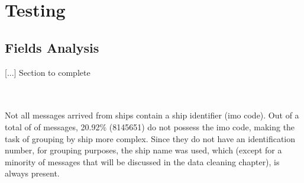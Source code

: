 \chapter{Testing}

\section{Fields Analysis}

[...] Section to complete

\\

\\
Not all messages arrived from ships contain a ship identifier (imo code). Out of a total of  of messages, 20.92\% (8145651) do not possess the imo code, making the task of grouping by ship more complex.
Since they do not have an identification number, for grouping purposes, the ship name was used, which (except for a minority of messages that will be discussed in the data cleaning chapter), is always present.